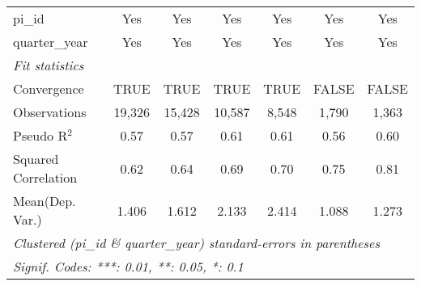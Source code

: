 \begin{tabular}{lcccccc}
   pi\_id                                                     & Yes           & Yes           & Yes           & Yes           & Yes           & Yes\\  
   quarter\_year                                              & Yes           & Yes           & Yes           & Yes           & Yes           & Yes\\  
   \midrule
   \emph{Fit statistics}\\
   Convergence                                                &TRUE           & TRUE          & TRUE          & TRUE          & FALSE         & FALSE\\  
   Observations                                               & 19,326        & 15,428        & 10,587        & 8,548         & 1,790         & 1,363\\  
   Pseudo R$^2$                                               & 0.57          & 0.57          & 0.61          & 0.61          & 0.56          & 0.60\\  
   Squared Correlation                                        & 0.62          & 0.64          & 0.69          & 0.70          & 0.75          & 0.81\\  
Mean(Dep. Var.) & 1.406 & 1.612 & 2.133 & 2.414 & 1.088 & 1.273 \\
   \midrule \midrule
   \multicolumn{7}{l}{\emph{Clustered (pi\_id \& quarter\_year) standard-errors in parentheses}}\\
   \multicolumn{7}{l}{\emph{Signif. Codes: ***: 0.01, **: 0.05, *: 0.1}}\\
\end{tabular}
\par\endgroup
